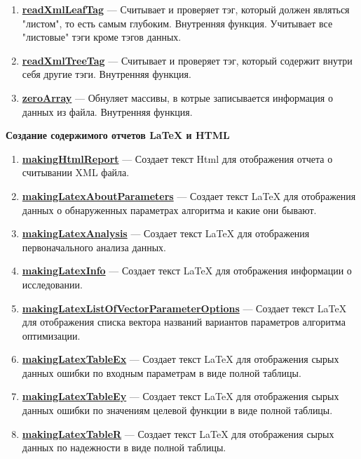 \documentclass[a4paper,12pt]{article}
\begin{document}
\begin{enumerate}
\item \textbf{\hyperref[readXmlLeafTag]{readXmlLeafTag}} --- Считывает и проверяет тэг, который должен являться "листом", то есть самым глубоким. Внутренняя функция. Учитывает все "листовые" тэги кроме тэгов данных.

\item \textbf{\hyperref[readXmlTreeTag]{readXmlTreeTag}} --- Считывает и проверяет тэг, который содержит внутри себя другие тэги. Внутренняя функция.

\item \textbf{\hyperref[zeroArray]{zeroArray}} --- Обнуляет массивы, в котрые записывается информация о данных из файла. Внутренняя функция.

\end{enumerate}

\textbf{Создание содержимого отчетов LaTeX и HTML}
\begin{enumerate}

\item \textbf{\hyperref[makingHtmlReport]{makingHtmlReport}} --- Создает текст Html для отображения отчета о считывании XML файла.

\item \textbf{\hyperref[makingLatexAboutParameters]{makingLatexAboutParameters}} --- Создает текст LaTeX для отображения данных о обнаруженных параметрах алгоритма и какие они бывают.

\item \textbf{\hyperref[makingLatexAnalysis]{makingLatexAnalysis}} --- Создает текст LaTeX для отображения первоначального анализа данных.

\item \textbf{\hyperref[makingLatexInfo]{makingLatexInfo}} --- Создает текст LaTeX для отображения информации о исследовании.

\item \textbf{\hyperref[makingLatexListOfVectorParameterOptions]{makingLatexListOfVectorParameterOptions}} --- Создает текст LaTeX для отображения списка вектора названий вариантов параметров алгоритма оптимизации.

\item \textbf{\hyperref[makingLatexTableEx]{makingLatexTableEx}} --- Создает текст LaTeX для отображения сырых данных ошибки по входным параметрам в виде полной таблицы.

\item \textbf{\hyperref[makingLatexTableEy]{makingLatexTableEy}} --- Создает текст LaTeX для отображения сырых данных ошибки по значениям целевой функции в виде полной таблицы.

\item \textbf{\hyperref[makingLatexTableR]{makingLatexTableR}} --- Создает текст LaTeX для отображения сырых данных по надежности в виде полной таблицы.

\end{enumerate}
\end{document}
